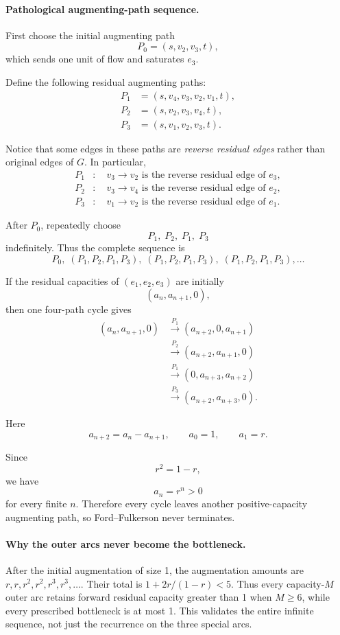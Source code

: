 \documentclass[10pt]{article}
\theoremstyle{definition}
\begin{document}
\paragraph{Pathological augmenting-path sequence.}

First choose the initial augmenting path
\[
P_0=(s,v_2,v_3,t),
\]
which sends one unit of flow and saturates $e_3$.

Define the following residual augmenting paths:
\begin{align*}
P_1 &= (s,v_4,v_3,v_2,v_1,t),\\
P_2 &= (s,v_2,v_3,v_4,t),\\
P_3 &= (s,v_1,v_2,v_3,t).
\end{align*}

Notice that some edges in these paths are
\emph{reverse residual edges} rather than original edges of $G$.
In particular,
\begin{align*}
P_1 &: \quad v_3 \to v_2
      \text{ is the reverse residual edge of }e_3,\\
P_2 &: \quad v_3 \to v_4
      \text{ is the reverse residual edge of }e_2,\\
P_3 &: \quad v_1 \to v_2
      \text{ is the reverse residual edge of }e_1.
\end{align*}

After $P_0$, repeatedly choose
\[
\boxed{
P_1,\;P_2,\;P_1,\;P_3
}
\]
indefinitely. Thus the complete sequence is
\[
\boxed{
P_0,\;
(P_1,P_2,P_1,P_3),\;
(P_1,P_2,P_1,P_3),\;
(P_1,P_2,P_1,P_3),\ldots
}
\]

If the residual capacities of $(e_1,e_2,e_3)$ are initially
\[
(a_n,a_{n+1},0),
\]
then one four-path cycle gives
\begin{align*}
(a_n,a_{n+1},0)
&\xrightarrow{P_1}
(a_{n+2},0,a_{n+1})\\
&\xrightarrow{P_2}
(a_{n+2},a_{n+1},0)\\
&\xrightarrow{P_1}
(0,a_{n+3},a_{n+2})\\
&\xrightarrow{P_3}
(a_{n+2},a_{n+3},0).
\end{align*}

Here
\[
a_{n+2}=a_n-a_{n+1},
\qquad
a_0=1,
\qquad
a_1=r.
\]

Since
\[
r^2=1-r,
\]
we have
\[
a_n=r^n>0
\]
for every finite $n$. Therefore every cycle leaves another
positive-capacity augmenting path, so Ford--Fulkerson never terminates.




\paragraph{Why the outer arcs never become the bottleneck.}
After the initial augmentation of size 1, the augmentation amounts are
$r,r,r^2,r^2,r^3,r^3,\ldots$. Their total is
$1+2r/(1-r)<5$. Thus every capacity-$M$ outer arc retains forward residual capacity
greater than 1 when $M\ge6$, while every prescribed bottleneck is at most 1.
This validates the entire infinite sequence, not just the recurrence on the three special arcs.
\end{document}
